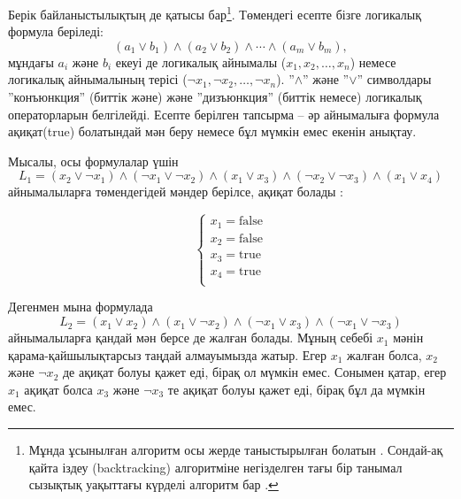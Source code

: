 Берік байланыстылықтың  де қатысы бар\footnote{Мұнда ұсынылған алгоритм осы жерде таныстырылған болатын \cite{asp79}.
Сондай-ақ қайта іздеу   (backtracking) алгоритміне негізделген тағы бір танымал сызықтық уақыттағы күрделі алгоритм бар \cite{eve75}.}.
Төмендегі есепте бізге логикалық формула беріледі:
\[
(a_1 \lor b_1) \land (a_2 \lor b_2) \land \cdots \land (a_m \lor b_m),
\]
мұндағы $a_i$ және $b_i$ екеуі де логикалық айнымалы
($x_1,x_2,\ldots,x_n$)
немесе логикалық айнымалының терісі
($\lnot x_1, \lnot x_2, \ldots, \lnot x_n$).
''$\land$'' және ''$\lor$'' символдары ''конъюнкция'' (биттік және) және ''дизъюнкция''
(биттік немесе) логикалық операторларын белгілейді.
Есепте берілген тапсырма -- әр айнымалыға формула
ақиқат(true) болатындай мән беру немесе бұл мүмкін
емес екенін анықтау. 

Мысалы, осы формулалар үшін
\[
L_1 = (x_2 \lor \lnot x_1) \land
      (\lnot x_1 \lor \lnot x_2) \land
      (x_1 \lor x_3) \land
      (\lnot x_2 \lor \lnot x_3) \land
      (x_1 \lor x_4)
\]
айнымалыларға төмендегідей мәндер берілсе, ақиқат болады :

\[
\begin{cases}
x_1 = \textrm{false} \\
x_2 = \textrm{false} \\
x_3 = \textrm{true} \\
x_4 = \textrm{true} \\
\end{cases}
\]

Дегенмен мына формулада
\[
L_2 = (x_1 \lor x_2) \land
      (x_1 \lor \lnot x_2) \land
      (\lnot x_1 \lor x_3) \land
      (\lnot x_1 \lor \lnot x_3)
\]
айнымалыларға қандай мән берсе де жалған болады.
Мұның себебі $x_1$ мәнін қарама-қайшылықтарсыз
таңдай алмауымызда жатыр. Егер $x_1$ жалған болса, $x_2$ және $\lnot x_2$ 
де ақиқат болуы қажет еді, бірақ ол мүмкін емес. Сонымен қатар, егер $x_1$ ақиқат
болса $x_3$ және $\lnot x_3$ те ақиқат болуы қажет еді, бірақ бұл да мүмкін
емес.

